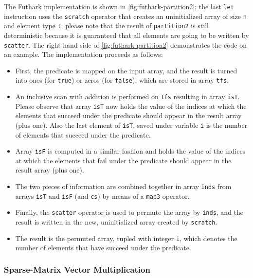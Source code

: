 \documentclass[acmsmall,review]{acmart}\settopmatter{printfolios=true,printccs=false,printacmref=false}
\begin{document}
The Futhark implementation is shown in \cref{fig:futhark-partition2};
the last {\tt let} instruction uses the {\tt scratch} operator
that creates an uninitialized array of size {\tt n} and element
type {\tt t}; please note that the result of {\tt partition2} is 
still deterministic because it is guaranteed that all elements
are going to be written by \lstinline{scatter}. 
%
The right hand  side of \cref{fig:futhark-partition2} demonstrates
the code on an example. The implementation proceeds as follows:
\begin{itemize}
    \item First, the predicate is mapped on the input array,
            and the result is turned into ones (for \lstinline{true})
            or zeros (for \lstinline{false}), which are stored in
            array {\tt tfs}.
    \item An inclusive scan with addition is performed on {\tt tfs}
            resulting in array {\tt isT}. Please observe that 
            array {\tt isT} now holds the value of the indices at 
            which the elements that succeed under the predicate
            should appear in the result array (plus one). Also
            the last element of {\tt isT}, saved under variable 
            {\tt i} is the number of elements that succeed under 
            the predicate.
    \item Array {\tt isF} is computed in a similar fashion and
            holds the value of the indices at which the elements 
            that fail under the predicate
            should appear in the result array (plus one).
    \item The two pieces of information are combined together
            in array {\tt inds} from arrays {\tt isT} and {\tt isF}
            (and {\tt cs}) by means of a \lstinline{map3} operator.
    \item Finally, the \lstinline{scatter} operator is used to
            permute the array by {\tt inds}, and the result is
            written in the new, uninitialized array created by 
            \lstinline{scratch}.
    \item The result is the permuted array, tupled with integer {\tt i},
            which denotes the number of elements that have succeed 
            under the predicate.
\end{itemize}


\subsubsection{Sparse-Matrix Vector Multiplication}
\label{subsubsub:sparse-mat-vec-mult}
$\mbox{ }$\\
\end{document}
